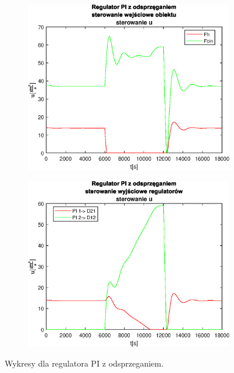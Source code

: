 \begin{figure}[h!]
   \begin{subfigure}[b]{0.4\textwidth}
      \includegraphics[width=1\linewidth]{img/PI/decoupler/noDisturbance/PIDecouplerControl3Lintrue.eps}
      \caption{}
      \label{fig:fig:PIDecoupler3Lintrue3}
   \end{subfigure}
       
   \begin{subfigure}[b]{0.4\textwidth}
      \includegraphics[width=1\linewidth]{img/PI/decoupler/noDisturbance/PIDecouplerControlD3Lintrue.eps}
      \caption{}
      \label{fig:fig:PIDecoupler3Lintrue4}
   \end{subfigure}
       
   \caption{Wykresy dla regulatora PI z odsprzeganiem.}
   \label{fig:PIDecoupler3Lintrue}
\end{figure}
           
